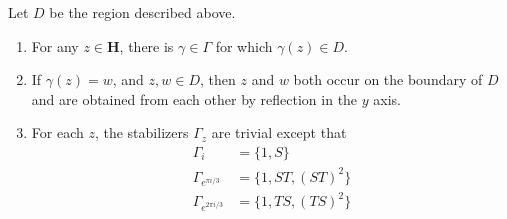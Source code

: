 \begin{theorem}
    Let $D$ be the region described above.
    \begin{enumerate}
        \item For any $z \in \mathbf{H}$, there is $\gamma \in \Gamma$ for which $\gamma(z) \in D$.
        \item If $\gamma(z) = w$, and $z,w \in D$, then $z$ and $w$ both occur on the boundary of $D$ and are obtained from each other by reflection in the $y$ axis.
        \item For each $z$, the stabilizers $\Gamma_z$ are trivial except that
        \begin{align*}
            \Gamma_i &= \{ 1, S \}\\
            \Gamma_{e^{\pi i/3}} &= \{ 1, ST, (ST)^2 \}\\
            \Gamma_{e^{2 \pi i/3}} &= \{ 1, TS, (TS)^2 \}
        \end{align*}
    \end{enumerate}
\end{theorem}
